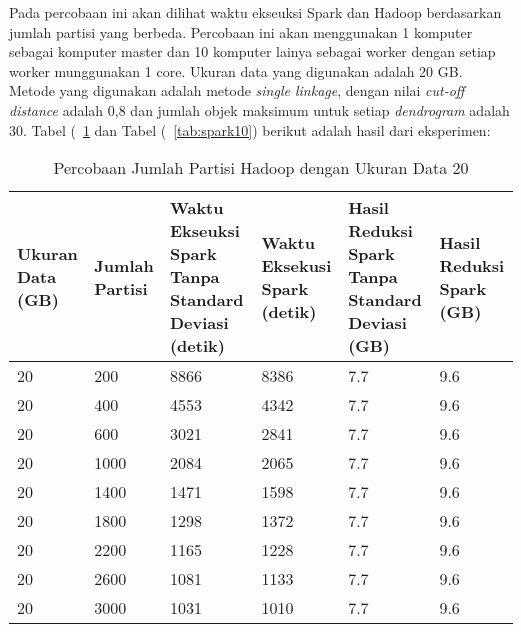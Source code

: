

Pada percobaan ini akan dilihat waktu ekseuksi Spark dan Hadoop berdasarkan jumlah partisi yang berbeda. Percobaan ini akan menggunakan 1 komputer sebagai komputer master dan 10 komputer lainya sebagai worker dengan setiap worker munggunakan 1 core. Ukuran data yang digunakan adalah 20 GB. Metode yang digunakan adalah metode \textit{single linkage}, dengan nilai \textit{cut-off distance} adalah 0,8 dan jumlah objek maksimum untuk setiap \textit{dendrogram} adalah 30. Tabel (~\ref{tab:spark9} dan Tabel (~\ref{tab:spark10}) berikut adalah hasil dari eksperimen:

\begin{table}[H] 
	\centering 
	\caption{Percobaan Jumlah Partisi Hadoop dengan Ukuran Data 20}
	\label{tab:spark9}
	\begin{tabular}{|p{1cm}|p{1cm}|p{3cm}|p{3cm}|p{3cm}|p{3cm}|}
\hline
Ukuran Data (GB) & Jumlah Partisi &  Waktu Ekseuksi Spark Tanpa Standard Deviasi (detik) & Waktu Eksekusi Spark (detik) & Hasil Reduksi Spark Tanpa Standard Deviasi (GB) & Hasil Reduksi Spark (GB)  \\ 
\hline
20 & 200 & 8866  & 8386  & 7.7 & 9.6 \\
\hline
20 & 400 & 4553  & 4342  & 7.7 & 9.6 \\
\hline
20 & 600 & 3021  & 2841  &  7.7 & 9.6 \\
\hline
20 & 1000 & 2084  & 2065  & 7.7 & 9.6 \\
\hline
20 & 1400 & 1471  & 1598  & 7.7 & 9.6 \\
\hline
20 & 1800 & 1298  & 1372  & 7.7 & 9.6 \\
\hline
20 & 2200 & 1165  & 1228  & 7.7 & 9.6 \\
\hline
20 & 2600 & 1081  & 1133  & 7.7 & 9.6 \\
\hline
20 & 3000 & 1031  & 1010  & 7.7 & 9.6 \\
\hline

\hline

	\end{tabular} 
\end{table}



